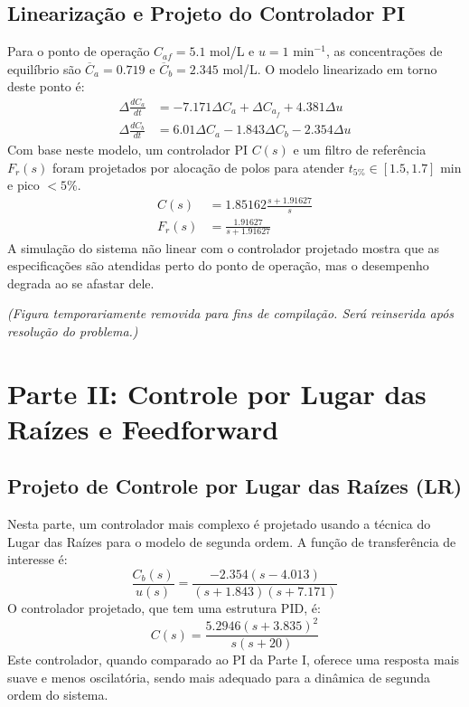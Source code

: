 \documentclass[a4paper,12pt]{report}
\begin{document}
\section{Linearização e Projeto do Controlador PI}
Para o ponto de operação \( C_{af} = 5.1 \) mol/L e \( u = 1 \) min\(^{-1}\), as concentrações de equilíbrio são \( \overline{C}_a = 0.719 \) e \( \overline{C}_b = 2.345 \) mol/L. O modelo linearizado em torno deste ponto é:
\begin{align}
\Delta\frac{dC_a}{dt} &= -7.171 \Delta C_a + \Delta C_{a_f} + 4.381\Delta u \\
\Delta\frac{dC_b}{dt} &= 6.01 \Delta C_a -1.843\Delta C_b - 2.354 \Delta u
\end{align}
Com base neste modelo, um controlador PI \(C(s)\) e um filtro de referência \(F_r(s)\) foram projetados por alocação de polos para atender \(t_{5\%} \in [1.5, 1.7]\) min e pico \(< 5\%\).
\begin{align}
C(s) &= 1.85162 \frac{s + 1.91627}{s} \\
F_r(s) &= \frac{1.91627}{s + 1.91627}
\end{align}
A simulação do sistema não linear com o controlador projetado mostra que as especificações são atendidas perto do ponto de operação, mas o desempenho degrada ao se afastar dele.

\textit{(Figura temporariamente removida para fins de compilação. Será reinserida após resolução do problema.)}

\chapter{Parte II: Controle por Lugar das Raízes e Feedforward}
\section{Projeto de Controle por Lugar das Raízes (LR)}
Nesta parte, um controlador mais complexo é projetado usando a técnica do Lugar das Raízes para o modelo de segunda ordem. A função de transferência de interesse é:
\begin{equation}
\frac{ C_b(s)}{u(s)} = \frac{-2.354(s-4.013)}{(s + 1.843)(s + 7.171)}
\end{equation}
O controlador projetado, que tem uma estrutura PID, é:
\begin{equation}
C(s)=\frac{5.2946(s+3.835)^2}{s(s+20)}  
\end{equation}
Este controlador, quando comparado ao PI da Parte I, oferece uma resposta mais suave e menos oscilatória, sendo mais adequado para a dinâmica de segunda ordem do sistema.
\end{document}
